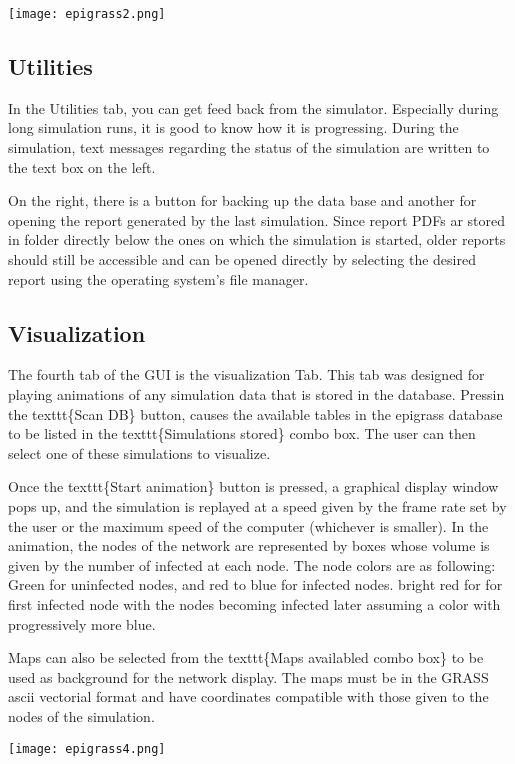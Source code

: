 \documentclass[a4paper,10pt]{manual}
\begin{document}
\texttt{[image: epigrass2.png]}


\subsection{Utilities}

In the Utilities tab, you can get feed back from the simulator. Especially during long simulation runs, it is good to know how it is progressing. During the simulation, text messages regarding the status of the simulation are written to the text box on the left.

On the right, there is a button for backing up the data base and another for opening the report generated by the last simulation. Since report PDFs ar stored in folder directly below the ones on which the simulation is started, older reports should still be accessible and can be opened directly by selecting the desired report using the operating system's file manager.


\subsection{Visualization}

The fourth tab of the GUI is the visualization Tab. This tab was designed for playing animations of any simulation data that is stored in the database. Pressin the texttt\{Scan DB\} button, causes the available tables in the  epigrass database to be listed in the texttt\{Simulations stored\} combo box. The user can then select one of these simulations to visualize.

Once the texttt\{Start animation\} button is pressed, a graphical display window pops up, and the simulation is replayed at a speed given by the frame rate set by the user  or the maximum speed of the computer (whichever is smaller). In the animation, the nodes of the network are represented by boxes whose volume is given by the number of infected at each node. The node colors are as following: Green for uninfected nodes, and red to blue for infected nodes. bright red for for first infected node with the nodes becoming infected later assuming a color with progressively more blue.

Maps can also be selected from the texttt\{Maps availabled combo box\} to be used as background for the network display. The maps must be in the GRASS ascii vectorial format and have coordinates compatible with those given to the nodes of the simulation.

\texttt{[image: epigrass4.png]}
\end{document}
